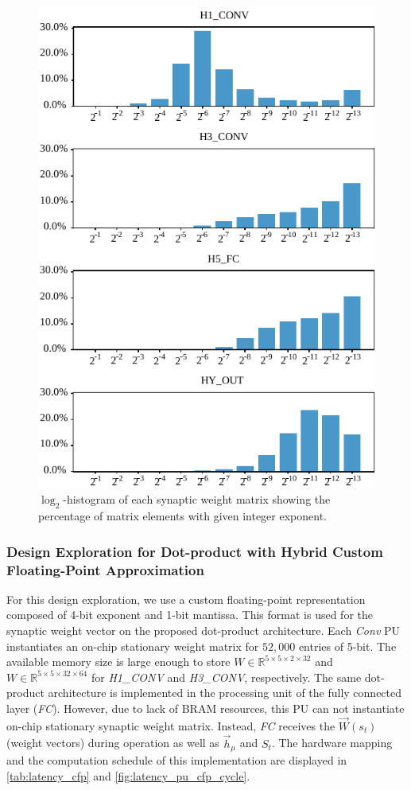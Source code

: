 \begin{figure}[b!]
	\centering
	\includegraphics[width=0.5\columnwidth]{./chapters/sbs_accelerator/figures/log2_histogram.pdf}
	\caption{$\log_2$-histogram of each synaptic weight matrix showing the percentage of matrix elements with given integer exponent.}\label{fig:log2histogram}
\end{figure}

\subsubsection{Design Exploration for Dot-product with Hybrid Custom Floating-Point Approximation}
For this design exploration, we use a custom floating-point representation composed of 4-bit exponent and 1-bit mantissa. This format is used for the synaptic weight vector on the proposed dot-product architecture. Each \emph{Conv} PU instantiates an on-chip stationary weight matrix for $52,000$ entries of 5-bit. The available memory size is large enough to store $W\in\mathbb{R}^{5\times 5\times 2\times 32}$ and $W\in\mathbb{R}^{5\times 5\times 32\times 64}$ for \emph{H1\_CONV} and \emph{H3\_CONV}, respectively. The same dot-product architecture is implemented in the processing unit of the fully connected layer (\emph{FC}). However, due to lack of BRAM resources, this PU can not instantiate on-chip stationary synaptic weight matrix. Instead, \emph{FC} receives the $\vec{W}(s_t)$ (weight vectors) during operation as well as $\vec{h}_\mu$ and $S_t$. The hardware mapping and the computation schedule of this implementation are displayed in \ref{tab:latency_cfp} and \ref{fig:latency_pu_cfp_cycle}.

